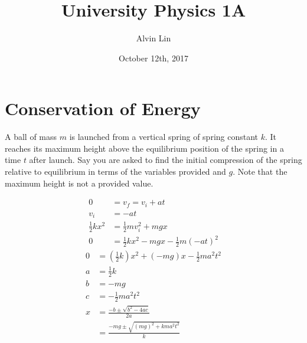 \documentclass{math}
\title{University Physics 1A}
\author{Alvin Lin}
\date{October 12th, 2017}
\begin{document}
\maketitle

\section*{Conservation of Energy}
A ball of mass \( m \) is launched from a vertical spring of spring
constant \( k \). It reaches its maximum height above the equilibrium
position of the spring in a time \( t \) after launch. Say you are asked to
find the initial compression of the spring relative to equilibrium in terms
of the variables provided and \( g \). Note that the maximum height is not a
provided value.
\begin{center}
\end{center}
\begin{align*}
  0 &= v_f = v_i+at \\
  v_i &= -at \\
  \frac{1}{2}kx^2 &= \frac{1}{2}mv_i^2+mgx \\
  0 &= \frac{1}{2}kx^2-mgx-\frac{1}{2}m(-at)^2
\end{align*}
\begin{align*}
  0 &= \left(\frac{1}{2}k\right)x^2+(-mg)x-\frac{1}{2}ma^2t^2 \\
  a &= \frac{1}{2}k \\
  b &= -mg \\
  c &= -\frac{1}{2}ma^2t^2 \\
  x &= \frac{-b\pm\sqrt{b^2-4ac}}{2a} \\
  &= \frac{-mg\pm\sqrt{(mg)^2+kma^2t^2}}{k}
\end{align*}
\end{document}
